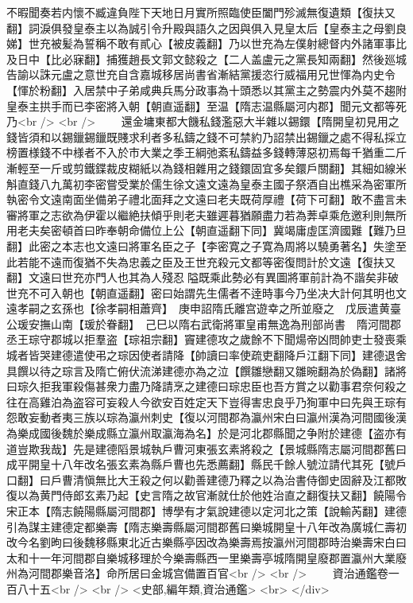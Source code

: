 不暇聞奏若内懷不臧違負陛下天地日月實所照臨使臣闔門殄滅無復遺類【復扶又翻】詞淚俱發皇泰主以為誠引令升殿與語久之因與俱入見皇太后【皇泰主之母劉良娣】世充被髪為誓稱不敢有貳心【被皮義翻】乃以世充為左僕射總督内外諸軍事比及日中【比必寐翻】捕獲趙長文郭文懿殺之【二人盖盧元之黨長知兩翻】然後廵城告諭以誅元盧之意世充自含嘉城移居尚書省漸結黨援恣行威福用兄世惲為内史令【惲於粉翻】入居禁中子弟咸典兵馬分政事為十頭悉以其黨主之勢震内外莫不趨附皇泰主拱手而已李密將入朝【朝直遥翻】至温【隋志温縣屬河内郡】聞元文都等死乃<br />
<br />
　　還金墉東都大饑私錢濫惡大半雜以錫鐶【隋開皇初見用之錢皆須和以錫鑞錫鑞既賤求利者多私鑄之錢不可禁約乃詔禁出錫鑞之處不得私採立榜置様錢不中様者不入於市大業之季王綱弛紊私鑄益多錢轉薄惡初焉每千猶重二斤漸輕至一斤或剪鐵鍱裁皮糊紙以為錢相雜用之錢鐶固宜多矣鐶戶關翻】其細如線米斛直錢八九萬初李密嘗受業於儒生徐文遠文遠為皇泰主國子祭酒自出樵采為密軍所執密令文遠南面坐備弟子禮北面拜之文遠曰老夫既荷厚禮【荷下可翻】敢不盡言未審將軍之志欲為伊霍以繼絶扶傾乎則老夫雖遲暮猶願盡力若為莾卓乘危邀利則無所用老夫矣密頓首曰昨奉朝命備位上公【朝直遥翻下同】冀竭庸虛匡濟國難【難乃旦翻】此密之本志也文遠曰將軍名臣之子【李密寛之子寛為周將以驍勇著名】失塗至此若能不遠而復猶不失為忠義之臣及王世充殺元文都等密復問計於文遠【復扶又翻】文遠曰世充亦門人也其為人殘忍隘既乘此勢必有異圖將軍前計為不諧矣非破世充不可入朝也【朝直遥翻】密曰始謂先生儒者不逹時事今乃坐决大計何其明也文遠孝嗣之玄孫也【徐孝嗣相蕭齊】　庚申詔隋氏離宫遊幸之所並廢之　戊辰遣黄臺公瑗安撫山南【瑗於眷翻】　己巳以隋右武衛將軍皇甫無逸為刑部尚書　隋河間郡丞王琮守郡城以拒羣盗【琮祖宗翻】竇建德攻之歲餘不下聞煬帝凶問帥吏士發喪乘城者皆哭建德遣使弔之琮因使者請降【帥讀曰率使疏吏翻降戶江翻下同】建德退舍具饌以待之琮言及隋亡俯伏流涕建德亦為之泣【饌雛戀翻又雛晼翻為於偽翻】諸將曰琮久拒我軍殺傷甚衆力盡乃降請烹之建德曰琮忠臣也吾方賞之以勸事君奈何殺之往在高雞泊為盗容可妄殺人今欲安百姓定天下豈得害忠良乎乃狥軍中曰先與王琮有怨敢妄動者夷三族以琮為瀛州刺史【復以河間郡為瀛州宋白曰瀛州漢為河間國後漢為樂成國後魏於樂成縣立瀛州取瀛海為名】於是河北郡縣聞之争附於建德【盗亦有道豈欺我哉】先是建德䧟景城執戶曹河東張玄素將殺之【景城縣隋志屬河間郡舊曰成平開皇十八年改名張玄素為縣戶曹也先悉薦翻】縣民千餘人號泣請代其死【號戶口翻】曰戶曹清愼無比大王殺之何以勸善建德乃釋之以為治書侍御史固辭及江都敗復以為黄門侍郎玄素乃起【史言隋之故官漸就仕於他姓治直之翻復扶又翻】饒陽令宋正本【隋志饒陽縣屬河間郡】博學有才氣說建德以定河北之策【說輸芮翻】建德引為謀主建德定都樂壽【隋志樂壽縣屬河間郡舊曰樂城開皇十八年改為廣城仁壽初改今名劉昫曰後魏移縣東北近古樂縣亭因改為樂壽焉按瀛州河間郡時治樂壽宋白曰太和十一年河間郡自樂城移理於今樂壽縣西一里樂壽亭城隋開皇廢郡置瀛州大業廢州為河間郡樂音洛】命所居曰金城宫備置百官<br />
<br />
　　資治通鑑卷一百八十五<br />
<br />
<史部,編年類,資治通鑑>  <br>
   </div> 

